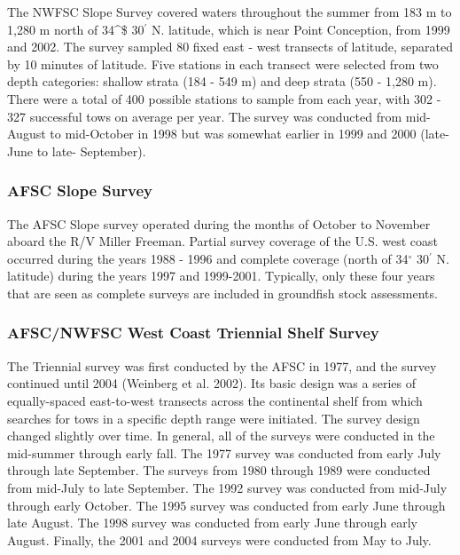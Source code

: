 \documentclass[
]{scrartcl}
\begin{document}
The NWFSC Slope Survey covered waters throughout the summer from 183 m
to 1,280 m north of 34\^{}\circ\$ 30\(^\prime\) N. latitude, which is
near Point Conception, from 1999 and 2002. The survey sampled 80 fixed
east - west transects of latitude, separated by 10 minutes of latitude.
Five stations in each transect were selected from two depth categories:
shallow strata (184 - 549 m) and deep strata (550 - 1,280 m). There were
a total of 400 possible stations to sample from each year, with 302 -
327 successful tows on average per year. The survey was conducted from
mid-August to mid-October in 1998 but was somewhat earlier in 1999 and
2000 (late-June to late- September).

\subsubsection{AFSC Slope Survey}\label{afsc-slope-survey}

The AFSC Slope survey operated during the months of October to November
aboard the R/V Miller Freeman. Partial survey coverage of the U.S. west
coast occurred during the years 1988 - 1996 and complete coverage (north
of 34\(^\circ\) 30\(^\prime\) N. latitude) during the years 1997 and
1999-2001. Typically, only these four years that are seen as complete
surveys are included in groundfish stock assessments.

\subsubsection{AFSC/NWFSC West Coast Triennial Shelf
Survey}\label{afscnwfsc-west-coast-triennial-shelf-survey}

The Triennial survey was first conducted by the AFSC in 1977, and the
survey continued until 2004 (Weinberg et al. 2002). Its basic design was
a series of equally-spaced east-to-west transects across the continental
shelf from which searches for tows in a specific depth range were
initiated. The survey design changed slightly over time. In general, all
of the surveys were conducted in the mid-summer through early fall. The
1977 survey was conducted from early July through late September. The
surveys from 1980 through 1989 were conducted from mid-July to late
September. The 1992 survey was conducted from mid-July through early
October. The 1995 survey was conducted from early June through late
August. The 1998 survey was conducted from early June through early
August. Finally, the 2001 and 2004 surveys were conducted from May to
July.
\end{document}
